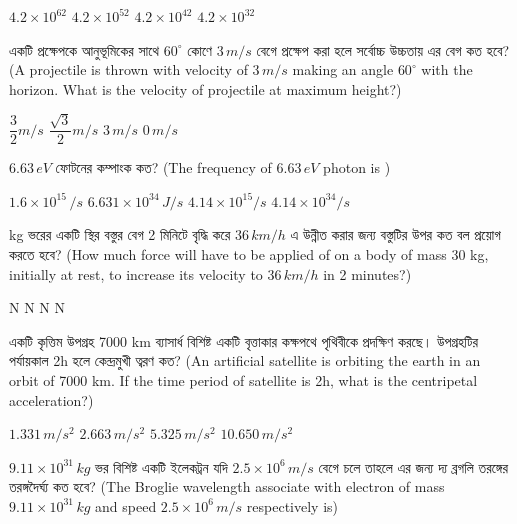 \documentclass[addpoints]{exam}
\begin{document}
\begin{questions}
\begin{oneparchoices}
\choice $ 4.2\times 10^{62} $
\choice $ 4.2\times 10^{52} $
\choice $ 4.2\times 10^{42} $
\choice $ 4.2\times 10^{32} $
\end{oneparchoices}

\question  একটি প্রক্ষেপকে আনুভূমিকের সাথে $ 60^{\circ} $ কোণে $ 3\,m/s $ বেগে প্রক্ষেপ করা হলে সর্বোচ্চ উচ্চতায় এর বেগ কত হবে? (A projectile is thrown with velocity of $ 3\,m/s $ making an angle $ 60^{\circ} $ with the horizon. What is the velocity of projectile at maximum height?)

\begin{oneparchoices}
\choice  $\dfrac{3}{2} m/s$
\choice  $\dfrac{\sqrt{3}}{2}m/s$
\choice  $ 3\,m/s $
\choice  $ 0\,m/s $
\end{oneparchoices}

\question $ 6.63\,eV $ ফোটনের কম্পাংক কত? (The frequency of $ 6.63\,eV $ photon is )

\begin{oneparchoices}
\choice $ 1.6\times 10^{15}\,/s $
\choice  $ 6.631\times 10^{34}\,J/s $
\choice  $ 4.14\times 10^{15}/s $
\choice  $ 4.14\times 10^{34}/s $
\end{oneparchoices}

 kg ভরের একটি স্থির বস্তুর বেগ 2 মিনিটে বৃদ্ধি করে $ 36\,km/h $ এ উন্নীত করার জন্য বস্তুটির উপর কত বল প্রয়োগ করতে হবে? (How much force will have to be applied of on a body of mass 30 kg, initially at rest, to increase its velocity to $ 36\,km/h $ in 2 minutes?)

\begin{oneparchoices}
 N
 N
 N
 N

\end{oneparchoices}


\question একটি কৃত্তিম উপগ্রহ 7000 km ব্যাসার্ধ বিশিষ্ট একটি বৃত্তাকার কক্ষপথে পৃথিবীকে প্রদক্ষিণ করছে। উপগ্রহটির পর্যায়কাল 2h হলে কেন্দ্রমুখী ত্বরণ কত? (An artificial satellite is orbiting the earth in an orbit of 7000 km. If the time period of satellite is 2h, what is the centripetal acceleration?)

\begin{oneparchoices}
\choice $ 1.331\,m/s^{2} $
\choice $ 2.663\,m/s^{2} $
\choice $ 5.325\,m/s^{2} $
\choice $ 10.650\,m/s^{2} $
\end{oneparchoices}



\question $ 9.11\times 10^{31}\,kg $ ভর বিশিষ্ট একটি ইলেকট্রন যদি $ 2.5\times 10^{6}\,m/s $ বেগে চলে তাহলে এর জন্য দ্য ব্রগলি তরঙ্গের তরঙ্গদৈর্ঘ্য কত হবে? (The Broglie wavelength associate with electron of mass $ 9.11\times 10^{31}\,kg $ and speed $ 2.5\times 10^{6}\,m/s $ respectively is)


\end{questions}
\end{document}
